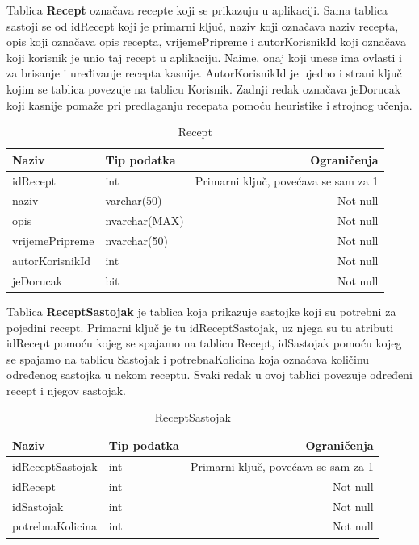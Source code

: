 \documentclass[diplomskirad]{fer}
\begin{document}
Tablica \textbf{Recept} označava recepte koji se prikazuju u aplikaciji. Sama tablica sastoji se od idRecept koji je primarni ključ, naziv koji označava naziv recepta, opis koji označava opis recepta, vrijemePripreme i autorKorisnikId koji označava koji korisnik je unio taj recept u aplikaciju. Naime, onaj koji unese ima ovlasti i za brisanje i uređivanje recepta kasnije. AutorKorisnikId je ujedno i strani ključ kojim se tablica povezuje na tablicu Korisnik. Zadnji redak označava jeDorucak koji kasnije pomaže pri predlaganju recepata pomoću heuristike i strojnog učenja.

\begin{table}[H]
\label{tbl:Recept}
\centering
\renewcommand{\arraystretch}{1.3}
\begin{tabular}{llr} \hline
Naziv & Tip podatka & Ograničenja\\ \hline
idRecept & int & Primarni ključ, povećava se sam za 1 \\
naziv & varchar(50) & Not null\\
opis & nvarchar(MAX) & Not null\\
vrijemePripreme & nvarchar(50) & Not null\\
autorKorisnikId & int & Not null\\
jeDorucak & bit & Not null \\
\end{tabular}
\caption{Recept}
\end{table}

Tablica \textbf{ReceptSastojak} je tablica koja prikazuje sastojke koji su potrebni za pojedini recept. Primarni ključ je tu idReceptSastojak, uz njega su tu atributi idRecept pomoću kojeg se spajamo na tablicu Recept, idSastojak pomoću kojeg se spajamo na tablicu Sastojak i potrebnaKolicina koja označava količinu određenog sastojka u nekom receptu. Svaki redak u ovoj tablici povezuje određeni recept i njegov sastojak.

\begin{table}[H]
\label{tbl:ReceptSastojak}
\centering
\renewcommand{\arraystretch}{1.3}
\begin{tabular}{llr} \hline
Naziv & Tip podatka & Ograničenja\\ \hline
idReceptSastojak & int & Primarni ključ, povećava se sam za 1 \\
idRecept & int & Not null\\
idSastojak & int & Not null\\
potrebnaKolicina & int & Not null\\
\end{tabular}
\caption{ReceptSastojak}
\end{table}
\end{document}
